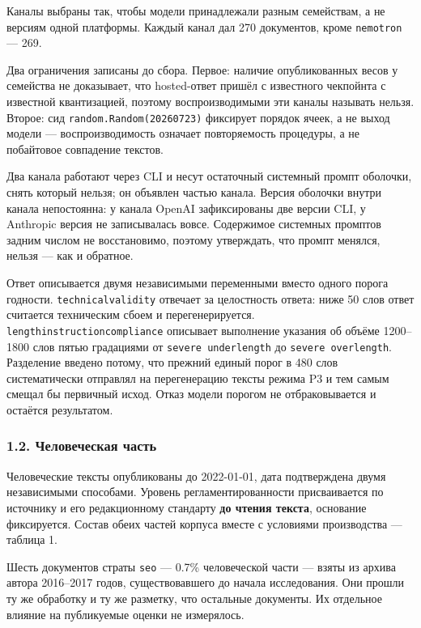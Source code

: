 \documentclass[11pt,a4paper]{article}
\renewcommand{\_}{\textunderscore\allowbreak}
\begin{document}
Каналы выбраны так, чтобы модели принадлежали разным семействам, а не версиям
одной платформы. Каждый канал дал 270 документов, кроме \texttt{nemotron} — 269.

Два ограничения записаны до сбора. Первое: наличие опубликованных весов у
семейства не доказывает, что hosted-ответ пришёл с известного чекпойнта с
известной квантизацией, поэтому воспроизводимыми эти каналы называть нельзя.
Второе: сид \texttt{random.Random(20260723)} фиксирует порядок ячеек, а не выход модели —
воспроизводимость означает повторяемость процедуры, а не побайтовое совпадение
текстов.

Два канала работают через CLI и несут остаточный системный промпт оболочки,
снять который нельзя; он объявлен частью канала. Версия оболочки внутри канала
непостоянна: у канала OpenAI зафиксированы две версии CLI, у Anthropic версия не
записывалась вовсе. Содержимое системных промптов задним числом не восстановимо,
поэтому утверждать, что промпт менялся, нельзя — как и обратное.

Ответ описывается двумя независимыми переменными вместо одного порога годности.
\texttt{technical\_validity} отвечает за целостность ответа: ниже 50 слов ответ считается
техническим сбоем и перегенерируется. \texttt{length\_instruction\_compliance} описывает
выполнение указания об объёме 1200–1800 слов пятью градациями от \texttt{severe
underlength} до \texttt{severe overlength}. Разделение введено потому, что прежний
единый порог в 480 слов систематически отправлял на перегенерацию тексты режима
P3 и тем самым смещал бы первичный исход. Отказ модели порогом не отбраковывается
и остаётся результатом.

\subsubsection{1.2. Человеческая часть}

Человеческие тексты опубликованы до 2022-01-01, дата подтверждена двумя
независимыми способами. Уровень регламентированности присваивается по источнику и
его редакционному стандарту \textbf{до чтения текста}, основание фиксируется. Состав
обеих частей корпуса вместе с условиями производства — таблица 1.

\setcounter{table}{0}


Шесть документов страты \texttt{seo} — 0.7\% человеческой части — взяты из архива автора
2016–2017 годов, существовавшего до начала исследования. Они прошли ту же обработку
и ту же разметку, что остальные документы. Их отдельное влияние на публикуемые
оценки не измерялось.
\end{document}
